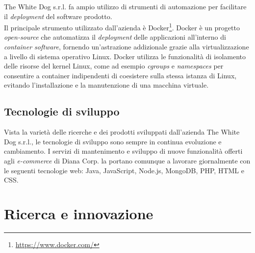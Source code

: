 The White Dog s.r.l. fa ampio utilizzo di strumenti di automazione per facilitare il \textit{deployment} del software prodotto. \\
Il principale strumento utilizzato dall'azienda è Docker\footnote[10]{\url{https://www.docker.com/}}. Docker è un progetto \textit{open-source} che automatizza il \textit{deployment} delle applicazioni all'interno di \textit{container software}, fornendo un'astrazione addizionale grazie alla virtualizzazione a livello di sistema operativo Linux. Docker utilizza le funzionalità di isolamento delle risorse del kernel Linux, come ad esempio \textit{cgroups} e \textit{namespaces} per consentire a container indipendenti di coesistere sulla stessa istanza di Linux, evitando l'installazione e la manutenzione di una macchina virtuale.

\subsection{Tecnologie di sviluppo}

Vista la varietà delle ricerche e dei prodotti sviluppati dall'azienda The White Dog s.r.l., le tecnologie di sviluppo sono sempre in continua evoluzione e cambiamento. I servizi di mantenimento e sviluppo di nuove funzionalità offerti agli \textit{e-commerce} di Diana Corp. la portano  comunque a lavorare giornalmente con le seguenti tecnologie web: Java, JavaScript, Node.js, MongoDB, PHP, HTML e CSS.

\section{Ricerca e innovazione}

